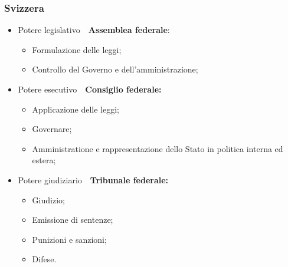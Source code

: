 \documentclass{article}
\begin{document}
\subsubsection{Svizzera}
\begin{itemize}
    \item Potere legislativo\ \textrightarrow\ \textbf{Assemblea federale}:
        \begin{itemize}
            \item Formulazione delle leggi;
            \item Controllo del Governo e dell'amministrazione;
        \end{itemize}
    \item Potere esecutivo\ \textrightarrow\ \textbf{Consiglio federale:}
        \begin{itemize}
            \item Applicazione delle leggi;
            \item Governare;
            \item Amministratione e rappresentazione dello Stato in politica interna ed estera;
        \end{itemize}
    \item Potere giudiziario\ \textrightarrow\ \textbf{Tribunale federale:}
        \begin{itemize}
            \item Giudizio;
            \item Emissione di sentenze;
            \item Punizioni e sanzioni;
            \item Difese.
        \end{itemize}
\end{itemize}
\end{document}
